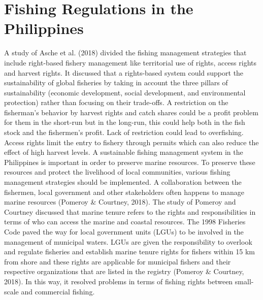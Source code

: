 \section{Fishing Regulations in the Philippines}

A study of Asche et al. (2018) divided the fishing management strategies that include right-based fishery management like territorial use of rights, access rights and harvest rights. It discussed that a rights-based system could support the sustainability of global fisheries by taking in account the three pillars of sustainability (economic development, social development, and environmental protection) rather than focusing on their trade-offs. A restriction on the fisherman’s behavior by harvest rights and catch shares could be a profit problem for them in the short-run but in the long-run, this could help both in the fish stock and the fishermen’s profit. Lack of restriction could lead to overfishing. Access rights limit the entry to fishery through permits which can also reduce the effect of high harvest levels. A sustainable fishing management system in the Philippines is important in order to preserve marine resources. To preserve these resources and protect the livelihood of local communities, various fishing management strategies should be implemented. A collaboration between the fishermen, local government and other stakeholders often happens to manage marine resources (Pomeroy \& Courtney, 2018). The study of Pomeroy and Courtney discussed that marine tenure refers to the rights and responsibilities in terms of who can access the marine and coastal resources. The 1998 Fisheries Code paved the way for local government units (LGUs) to be involved in the management of municipal waters. LGUs are given the responsibility to overlook and regulate fisheries and establish marine tenure rights for fishers within 15 km from shore  and these rights are applicable for municipal fishers and their respective organizations that are listed in the registry (Pomeroy \& Courtney, 2018). In this way, it resolved problems in terms of fishing rights between small-scale and commercial fishing.

